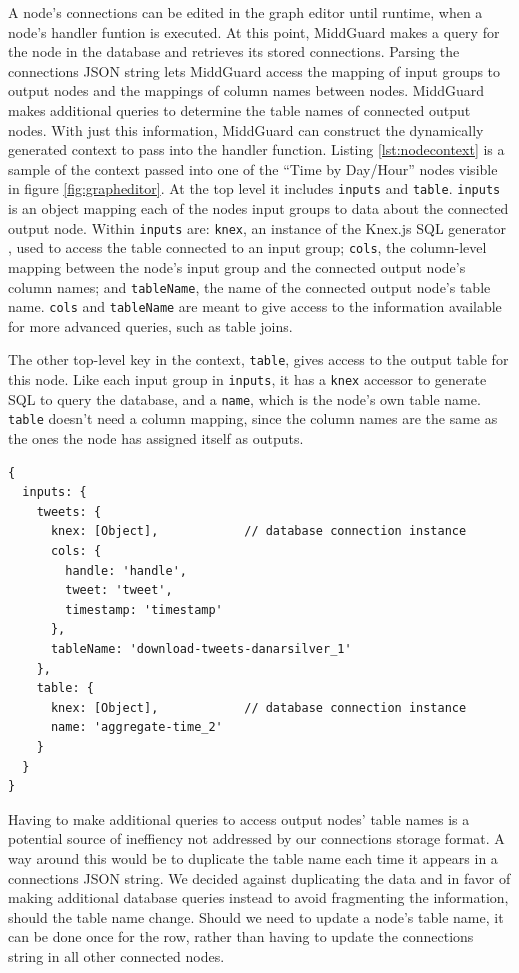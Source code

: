 \documentclass[midd]{thesis}
\begin{document}
A node's connections can be edited in the graph editor until runtime, when a
node's handler funtion is executed. At this point, MiddGuard makes a query for
the node in the database and retrieves its stored connections. Parsing the
connections JSON string lets MiddGuard access the mapping of input groups to
output nodes and the mappings of column names between nodes. MiddGuard makes
additional queries to determine the table names of connected output nodes. With
just this information, MiddGuard can construct the dynamically generated context
to pass into the handler function. Listing \ref{lst:nodecontext} is a sample of
the context passed into one of the ``Time by Day/Hour'' nodes visible in figure
\ref{fig:grapheditor}. At the top level it includes \texttt{inputs} and
\texttt{table}. \texttt{inputs} is an object mapping each of the nodes input
groups to data about the connected output node. Within \texttt{inputs} are:
\texttt{knex}, an instance of the Knex.js SQL generator \cite{knexjs}, used to
access the table connected to an input group; \texttt{cols}, the column-level
mapping between the node's input group and the connected output node's column
names; and \texttt{tableName}, the name of the connected output node's table
name. \texttt{cols} and \texttt{tableName} are meant to give access to the
information available for more advanced queries, such as table joins.

The other top-level key in the context, \texttt{table}, gives access to the
output table for this node. Like each input group in \texttt{inputs}, it has a
\texttt{knex} accessor to generate SQL to query the database, and a
\texttt{name}, which is the node's own table name. \texttt{table} doesn't need a
column mapping, since the column names are the same as the ones the node has
assigned itself as outputs.

\begin{lstlisting}[caption={The context passed into a ``Time by Day/Hour'' node's handler function.}, captionpos=b, label={lst:nodecontext}]
{
  inputs: {
    tweets: {
      knex: [Object],            // database connection instance
      cols: {
        handle: 'handle',
        tweet: 'tweet',
        timestamp: 'timestamp'
      },
      tableName: 'download-tweets-danarsilver_1'
    },
    table: {
      knex: [Object],            // database connection instance
      name: 'aggregate-time_2'
    }
  }
}
\end{lstlisting}

Having to make additional queries to access output nodes' table names is a
potential source of ineffiency not addressed by our connections storage format.
A way around this would be to duplicate the table name each time it appears in a
connections JSON string. We decided against duplicating the data and in favor of
making additional database queries instead to avoid fragmenting the information,
should the table name change. Should we need to update a node's table name, it
can be done once for the row, rather than having to update the connections
string in all other connected nodes.
\end{document}
